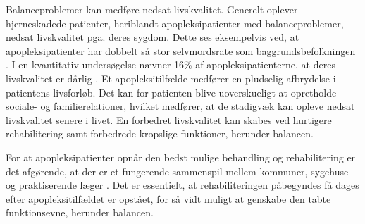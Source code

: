 Balanceproblemer kan medføre nedsat livskvalitet. Generelt oplever hjerneskadede patienter, heriblandt apopleksipatienter med balanceproblemer, nedsat livskvalitet pga. deres sygdom. Dette ses eksempelvis ved, at apopleksipatienter har dobbelt så stor selvmordsrate som baggrundsbefolkningen \cite{Sundhedsstyrelsen2010}. I en kvantitativ undersøgelse nævner 16\%  af apopleksipatienterne, at deres livskvalitet er dårlig  \cite{Sundhedsstyrelsen2010}. Et apopleksitilfælde medfører en pludselig afbrydelse i patientens livsforløb. Det kan for patienten blive uoverskueligt at opretholde sociale- og familierelationer, hvilket medfører, at de stadigvæk kan opleve nedsat livskvalitet senere i livet. En forbedret livskvalitet kan skabes ved hurtigere rehabilitering samt forbedrede kropslige funktioner, herunder balancen. \cite{Sundhedsstyrelsen2010}

For at apopleksipatienter opnår den bedst mulige behandling og rehabilitering er det afgørende, at der er et fungerende sammenspil mellem kommuner, sygehuse og praktiserende læger \cite{Sundhedsstyrelsen2010}. Det er essentielt, at rehabiliteringen påbegyndes få dages efter apopleksitilfældet er opstået, for så vidt muligt at genskabe den tabte funktionsevne, herunder balancen. \cite{kruuse2015} 





